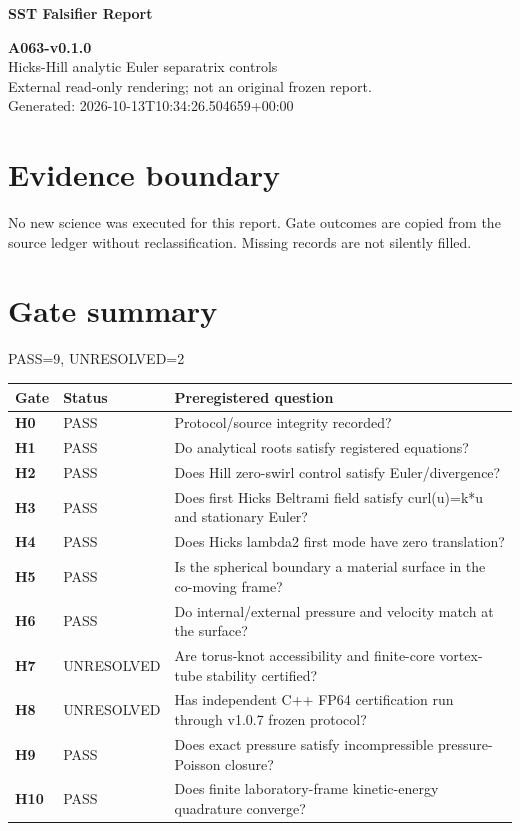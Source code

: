 \documentclass[10pt,a4paper]{article}
\begin{document}
\color{navy}\Huge\bfseries SST Falsifier Report\par\normalsize\mdseries\color{black}
\textbf{A063-v0.1.0}\\
Hicks-Hill analytic Euler separatrix controls\\
External read-only rendering; not an original frozen report.\\
Generated: 2026-10-13T10:34:26.504659+00:00\\
\section*{Evidence boundary}
No new science was executed for this report. Gate outcomes are copied from the source ledger without reclassification. Missing records are not silently filled.
\section*{Gate summary}
PASS=9, UNRESOLVED=2
\begin{longtable}{p{13mm}p{24mm}p{119mm}}
\toprule Gate & Status & Preregistered question \\
\midrule\endhead
\textbf{H0} & PASS & Protocol/source integrity recorded?\\\hline
\textbf{H1} & PASS & Do analytical roots satisfy registered equations?\\\hline
\textbf{H2} & PASS & Does Hill zero-swirl control satisfy Euler/divergence?\\\hline
\textbf{H3} & PASS & Does first Hicks Beltrami field satisfy curl(u)=k*u and stationary Euler?\\\hline
\textbf{H4} & PASS & Does Hicks lambda2 first mode have zero translation?\\\hline
\textbf{H5} & PASS & Is the spherical boundary a material surface in the co-moving frame?\\\hline
\textbf{H6} & PASS & Do internal/external pressure and velocity match at the surface?\\\hline
\textbf{H7} & UNRESOLVED & Are torus-knot accessibility and finite-core vortex-tube stability certified?\\\hline
\textbf{H8} & UNRESOLVED & Has independent C++ FP64 certification run through v1.0.7 frozen protocol?\\\hline
\textbf{H9} & PASS & Does exact pressure satisfy incompressible pressure-Poisson closure?\\\hline
\textbf{H10} & PASS & Does finite laboratory-frame kinetic-energy quadrature converge?\\\hline
\bottomrule\end{longtable}
\end{document}
